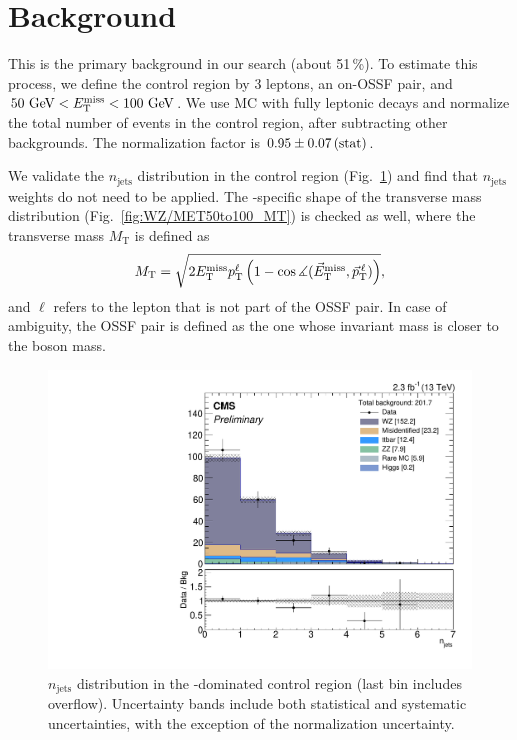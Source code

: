 \section{\texorpdfstring{\WZ}{WZ} Background}
\label{sec:bkg_WZ}

This is the primary background in our search (about 51\,\%). To estimate this process, we define the \WZ control region by 3 leptons, an on-\Z OSSF pair, and $50\,\,\text{Ge\hspace{-.08em}V} < E_{\mathrm{T}}^{\text{miss}} < 100\,\,\text{Ge\hspace{-.08em}V}$. We use \WZ MC with fully leptonic decays and normalize the total number of events in the control region, after subtracting other backgrounds. The normalization factor is $0.95 \pm 0.07\,\text{(stat)}$.

We validate the $n_\textrm{jets}$ distribution in the control region (Fig.~\ref{fig:WZ/NGOODJETS}) and find that $n_\textrm{jets}$ weights do not need to be applied. The \WZ-specific shape of the transverse mass distribution (Fig.~\ref{fig:WZ/MET50to100_MT}) is checked as well, where the transverse mass $M_\textrm{T}$ is defined as
$$M_\textrm{T} = \sqrt{2 E_{\mathrm{T}}^{\text{miss}} p_\textrm{T}^\ell \left( 1 - \cos\measuredangle(\vec E_\textrm{T}^\text{miss}, \vec p_\textrm{T}^{\,\ell}) \right)},$$ and $\ell$ refers to the lepton that is not part of the OSSF pair. In case of ambiguity, the OSSF pair is defined as the one whose invariant mass is closer to the \Z boson mass.

\begin{figure}
\begin{center}
	\includegraphics[width=.7\textwidth]{Background/bkg_WZ/WZ_MET50to100_NGOODJETS}
	\caption{$n_\textrm{jets}$ distribution in the \WZ-dominated control region (last bin includes overflow). Uncertainty bands include both statistical and systematic uncertainties, with the exception of the \WZ normalization uncertainty. 
	\label{fig:WZ/NGOODJETS}}
\end{center}
\end{figure}


